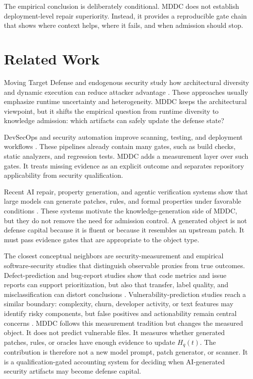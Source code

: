 ﻿\documentclass[lettersize,journal]{IEEEtran}
\begin{document}
The empirical conclusion is deliberately conditional. MDDC does not establish deployment-level repair superiority. Instead, it provides a reproducible gate chain that shows where context helps, where it fails, and when admission should stop.

\section{Related Work}
Moving Target Defense and endogenous security study how architectural diversity and dynamic execution can reduce attacker advantage \cite{ref7,ref5}. These approaches usually emphasize runtime uncertainty and heterogeneity. MDDC keeps the architectural viewpoint, but it shifts the empirical question from runtime diversity to knowledge admission: which artifacts can safely update the defense state?

DevSecOps and security automation improve scanning, testing, and deployment workflows \cite{rw_devsecops_scan,rw_supplychain}. These pipelines already contain many gates, such as build checks, static analyzers, and regression tests. MDDC adds a measurement layer over such gates. It treats missing evidence as an explicit outcome and separates repository applicability from security qualification.

Recent AI repair, property generation, and agentic verification systems show that large models can generate patches, rules, and formal properties under favorable conditions \cite{ref_patchagent,ref_propertygpt}. These systems motivate the knowledge-generation side of MDDC, but they do not remove the need for admission control. A generated object is not defense capital because it is fluent or because it resembles an upstream patch. It must pass evidence gates that are appropriate to the object type.

The closest conceptual neighbors are security-measurement and empirical software-security studies that distinguish observable proxies from true outcomes. Defect-prediction and bug-report studies show that code metrics and issue reports can support prioritization, but also that transfer, label quality, and misclassification can distort conclusions \cite{ref_menzies_defect,ref_zimmermann_cpdp,ref_bettenburg_bugreport,ref_herzig_misclassification}. Vulnerability-prediction studies reach a similar boundary: complexity, churn, developer activity, or text features may identify risky components, but false positives and actionability remain central concerns \cite{ref_shin_vulnerability_metrics,ref_morrison_vpm}. MDDC follows this measurement tradition but changes the measured object. It does not predict vulnerable files. It measures whether generated patches, rules, or oracles have enough evidence to update $H_q(t)$. The contribution is therefore not a new model prompt, patch generator, or scanner. It is a qualification-gated accounting system for deciding when AI-generated security artifacts may become defense capital.
\end{document}
